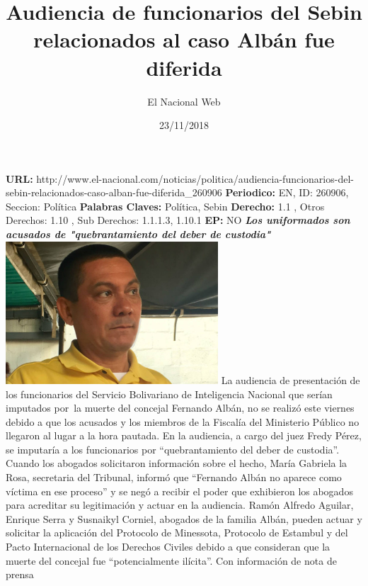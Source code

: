 \documentclass{article}%
\title{\textbf{Audiencia de funcionarios del Sebin relacionados al caso Albán fue diferida}}%
\author{El Nacional Web}%
\date{23/11/2018}%
\begin{document}
%
\normalsize%
\maketitle%
\textbf{URL: }%
http://www.el{-}nacional.com/noticias/politica/audiencia{-}funcionarios{-}del{-}sebin{-}relacionados{-}caso{-}alban{-}fue{-}diferida\_260906\newline%
%
\textbf{Periodico: }%
EN, %
ID: %
260906, %
Seccion: %
Política\newline%
%
\textbf{Palabras Claves: }%
Política, Sebin\newline%
%
\textbf{Derecho: }%
1.1%
, Otros Derechos: %
1.10%
, Sub Derechos: %
1.1.1.3, 1.10.1%
\newline%
%
\textbf{EP: }%
NO\newline%
\newline%
%
\textbf{\textit{Los uniformados son acusados de "quebrantamiento del deber de custodia"~}}%
\newline%
\newline%
%
\includegraphics[width=300px]{103.jpg}%
\newline%
%
La audiencia de presentación de los funcionarios del Servicio Bolivariano de Inteligencia Nacional que serían imputados por~la muerte del concejal Fernando Albán, no se realizó este viernes debido a que los acusados y los miembros de la Fiscalía del Ministerio Público no llegaron al lugar a la hora pautada.%
\newline%
%
En la audiencia, a cargo del juez Fredy Pérez, se imputaría a los funcionarios por “quebrantamiento del deber de custodia”.%
\newline%
%
Cuando los abogados solicitaron información sobre el hecho, María Gabriela la Rosa, secretaria del Tribunal, informó que “Fernando Albán no aparece como víctima en ese proceso” y se negó a recibir el poder que exhibieron los abogados para acreditar su legitimación y actuar en la audiencia.%
\newline%
%
Ramón Alfredo Aguilar, Enrique Serra y Susnaikyl Corniel, abogados de la familia Albán, pueden actuar y solicitar la aplicación del Protocolo de Minessota, Protocolo de Estambul y del Pacto Internacional de los Derechos Civiles debido a que consideran que la muerte del concejal fue “potencialmente ilícita”.%
\newline%
%
Con información de nota de prensa%
\newline%
%
\end{document}
